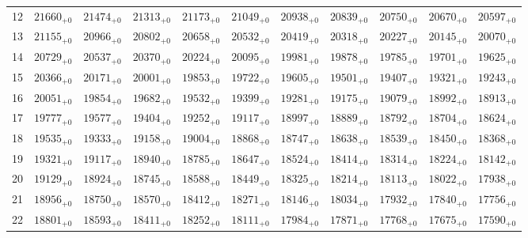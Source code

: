 \documentclass[10pt, a4paper]{article}
\begin{document}
\begin{center}
\begin{tabular}{c || c c c c c | c c c c c}
        12 & \({21660}_{+0}\) & \({21474}_{+0}\) & \({21313}_{+0}\) & \({21173}_{+0}\) & \({21049}_{+0}\) & \({20938}_{+0}\) & \({20839}_{+0}\) & \({20750}_{+0}\) & \({20670}_{+0}\) & \({20597}_{+0}\)\\
        13 & \({21155}_{+0}\) & \({20966}_{+0}\) & \({20802}_{+0}\) & \({20658}_{+0}\) & \({20532}_{+0}\) & \({20419}_{+0}\) & \({20318}_{+0}\) & \({20227}_{+0}\) & \({20145}_{+0}\) & \({20070}_{+0}\)\\
        14 & \({20729}_{+0}\) & \({20537}_{+0}\) & \({20370}_{+0}\) & \({20224}_{+0}\) & \({20095}_{+0}\) & \({19981}_{+0}\) & \({19878}_{+0}\) & \({19785}_{+0}\) & \({19701}_{+0}\) & \({19625}_{+0}\)\\
        15 & \({20366}_{+0}\) & \({20171}_{+0}\) & \({20001}_{+0}\) & \({19853}_{+0}\) & \({19722}_{+0}\) & \({19605}_{+0}\) & \({19501}_{+0}\) & \({19407}_{+0}\) & \({19321}_{+0}\) & \({19243}_{+0}\)\\
        \hline
        16 & \({20051}_{+0}\) & \({19854}_{+0}\) & \({19682}_{+0}\) & \({19532}_{+0}\) & \({19399}_{+0}\) & \({19281}_{+0}\) & \({19175}_{+0}\) & \({19079}_{+0}\) & \({18992}_{+0}\) & \({18913}_{+0}\)\\
        17 & \({19777}_{+0}\) & \({19577}_{+0}\) & \({19404}_{+0}\) & \({19252}_{+0}\) & \({19117}_{+0}\) & \({18997}_{+0}\) & \({18889}_{+0}\) & \({18792}_{+0}\) & \({18704}_{+0}\) & \({18624}_{+0}\)\\
        18 & \({19535}_{+0}\) & \({19333}_{+0}\) & \({19158}_{+0}\) & \({19004}_{+0}\) & \({18868}_{+0}\) & \({18747}_{+0}\) & \({18638}_{+0}\) & \({18539}_{+0}\) & \({18450}_{+0}\) & \({18368}_{+0}\)\\
        19 & \({19321}_{+0}\) & \({19117}_{+0}\) & \({18940}_{+0}\) & \({18785}_{+0}\) & \({18647}_{+0}\) & \({18524}_{+0}\) & \({18414}_{+0}\) & \({18314}_{+0}\) & \({18224}_{+0}\) & \({18142}_{+0}\)\\
        20 & \({19129}_{+0}\) & \({18924}_{+0}\) & \({18745}_{+0}\) & \({18588}_{+0}\) & \({18449}_{+0}\) & \({18325}_{+0}\) & \({18214}_{+0}\) & \({18113}_{+0}\) & \({18022}_{+0}\) & \({17938}_{+0}\)\\
        \hline
        21 & \({18956}_{+0}\) & \({18750}_{+0}\) & \({18570}_{+0}\) & \({18412}_{+0}\) & \({18271}_{+0}\) & \({18146}_{+0}\) & \({18034}_{+0}\) & \({17932}_{+0}\) & \({17840}_{+0}\) & \({17756}_{+0}\)\\
        22 & \({18801}_{+0}\) & \({18593}_{+0}\) & \({18411}_{+0}\) & \({18252}_{+0}\) & \({18111}_{+0}\) & \({17984}_{+0}\) & \({17871}_{+0}\) & \({17768}_{+0}\) & \({17675}_{+0}\) & \({17590}_{+0}\)\\

\end{tabular}
\end{center}
\end{document}
